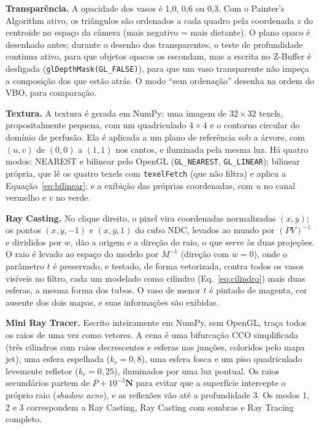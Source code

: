 \documentclass[11pt, a4paper]{article}
\newcommand{\vetor}[1]{\mathbf{#1}}
\begin{document}
\textbf{Transparência.} A opacidade dos vasos é 1,0, 0,6 ou 0,3. Com o Painter's Algorithm ativo, os triângulos são ordenados a cada quadro pela coordenada $z$ do centroide no espaço da câmera (mais negativo = mais distante). O plano opaco é desenhado antes; durante o desenho dos transparentes, o teste de profundidade continua ativo, para que objetos opacos os escondam, mas a escrita no Z-Buffer é desligada (\texttt{glDepthMask(GL\_FALSE)}), para que um vaso transparente não impeça a composição dos que estão atrás. O modo ``sem ordenação'' desenha na ordem do VBO, para comparação.

\textbf{Textura.} A textura é gerada em NumPy: uma imagem de $32 \times 32$ texels, propositalmente pequena, com um quadriculado $4 \times 4$ e o contorno circular do domínio de perfusão. Ela é aplicada a um plano de referência sob a árvore, com $(u, v)$ de $(0, 0)$ a $(1, 1)$ nos cantos, e iluminada pela mesma luz. Há quatro modos: NEAREST e bilinear pelo OpenGL (\texttt{GL\_NEAREST}, \texttt{GL\_LINEAR}); bilinear própria, que lê os quatro texels com \texttt{texelFetch} (que não filtra) e aplica a Equação~\eqref{eq:bilinear}; e a exibição das próprias coordenadas, com $u$ no canal vermelho e $v$ no verde.

\textbf{Ray Casting.} No clique direito, o pixel vira coordenadas normalizadas $(x, y)$; os pontos $(x, y, -1)$ e $(x, y, 1)$ do cubo NDC, levados ao mundo por $(PV)^{-1}$ e divididos por $w$, dão a origem e a direção do raio, o que serve às duas projeções. O raio é levado ao espaço do modelo por $M^{-1}$ (direção com $w = 0$), onde o parâmetro $t$ é preservado, e testado, de forma vetorizada, contra todos os vasos visíveis no filtro, cada um modelado como cilindro (Eq.~\ref{eq:cilindro}) mais duas esferas, a mesma forma dos tubos. O vaso de menor $t$ é pintado de magenta, cor ausente dos dois mapas, e suas informações são exibidas.

\textbf{Mini Ray Tracer.} Escrito inteiramente em NumPy, sem OpenGL, traça todos os raios de uma vez como vetores. A cena é uma bifurcação CCO simplificada (três cilindros com raios decrescentes e esferas nas junções, coloridos pelo mapa jet), uma esfera espelhada ($k_r = 0{,}8$), uma esfera fosca e um piso quadriculado levemente refletor ($k_r = 0{,}25$), iluminados por uma luz pontual. Os raios secundários partem de $P + 10^{-3}\vetor{N}$ para evitar que a superfície intercepte o próprio raio (\emph{shadow acne}), e as reflexões vão até a profundidade 3. Os modos 1, 2 e 3 correspondem a Ray Casting, Ray Casting com sombras e Ray Tracing completo.
\end{document}
